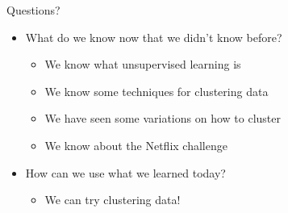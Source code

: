 \documentclass[aspectratio=169]{beamer}
\begin{document}
\begin{frame}{Questions?}
\begin{itemize}
	\item What do we know now that we didn't know before?
	\begin{itemize}
		\item We know what unsupervised learning is
		\item We know some techniques for clustering data 
		\item We have seen some variations on how to cluster
		\item We know about the Netflix challenge
	\end{itemize}
	\item How can we use what we learned today?
	\begin{itemize}
		\item We can try clustering data!
	\end{itemize}
\end{itemize}
\end{frame}
\end{document}
